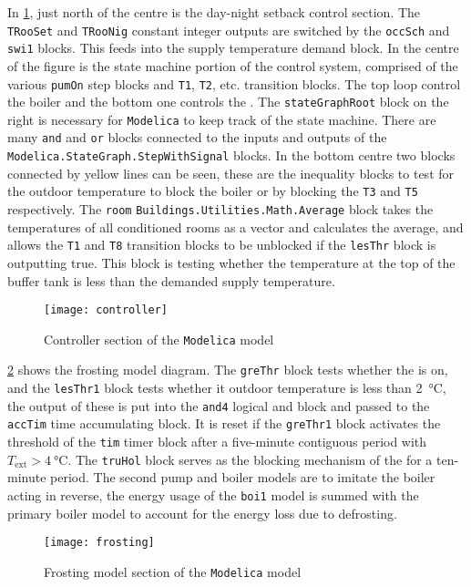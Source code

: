 In \cref{fig:controllersec}, just north of the centre is the day-night setback control section. The \texttt{TRooSet} and \texttt{TRooNig} constant integer outputs are switched by the \texttt{occSch} and \texttt{swi1} blocks. This feeds into the supply temperature demand block. In the centre of the figure is the state machine portion of the control system, comprised of the various \texttt{pumOn} step blocks and \texttt{T1}, \texttt{T2}, etc. transition blocks. The top loop control the boiler and the bottom one controls the \HP. The \texttt{stateGraphRoot} block on the right is necessary for \texttt{Modelica} to keep track of the state machine. There are many \texttt{and} and \texttt{or} blocks connected to the inputs and outputs of the \texttt{Modelica.StateGraph.StepWithSignal} blocks. In the bottom centre two blocks connected by yellow lines can be seen, these are the inequality blocks to test for the outdoor temperature to block the boiler or \HP by blocking the \texttt{T3} and \texttt{T5} respectively. The \texttt{room} \texttt{Buildings.Utilities.Math.Average} block takes the temperatures of all conditioned rooms as a vector and calculates the average, and allows the \texttt{T1} and \texttt{T8} transition blocks to be unblocked if the \texttt{lesThr} block is outputting true. This block is testing whether the temperature at the top of the buffer tank is less than the demanded supply temperature. 
\begin{figure}[htb]
    \centering
    \texttt{[image: controller]}
    \caption{Controller section of the \texttt{Modelica} model}
    \label{fig:controllersec}
\end{figure}

\cref{fig:frostingmodelsec} shows the frosting model diagram. The \texttt{greThr} block tests whether the \HP is on, and the \texttt{lesThr1} block tests whether it outdoor temperature is less than \qty{2}{\celsius}, the output of these is put into the \texttt{and4} logical and block and passed to the \texttt{accTim} time accumulating block. It is reset if the \texttt{greThr1} block activates the threshold of the \texttt{tim} timer block after a five-minute contiguous period with $T_\text{ext}>\qty{4}{\celsius}$. The \texttt{truHol} block serves as the blocking mechanism of the \HP for a ten-minute period. The second pump and boiler models are to imitate the boiler acting in reverse, the energy usage of the \texttt{boi1} model is summed with the primary boiler model to account for the energy loss due to defrosting. 
\begin{figure}[htb]
    \centering
    \texttt{[image: frosting]}
    \caption{Frosting model section of the \texttt{Modelica} model}
    \label{fig:frostingmodelsec}
\end{figure}


